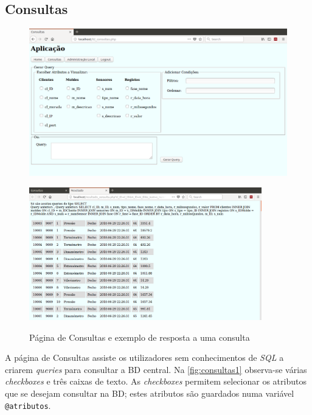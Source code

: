 \documentclass[11pt,twoside,a4paper]{report}
\begin{document}
\subsection{Consultas}
\begin{figure}[H]
	\centering
	\begin{minipage}{1.\textwidth}
		\begin{center}
			\includegraphics[width=.9\textwidth]{consultas01} %
			\label{fig:consultas1}
		\end{center}
	\end{minipage}
	\begin{minipage}{1.\textwidth}
		\begin{center}
			\includegraphics[width=0.9\textwidth]{consultas02} %
			\label{fig:consultas2}
		\end{center}
	\end{minipage}
	\caption{Página de Consultas e exemplo de resposta a uma consulta}
	\label{fig:consultas0}
\end{figure}
A página de Consultas assiste os utilizadores sem conhecimentos de \textit{SQL} a criarem \textit{queries} para consultar a BD central. Na \autoref{fig:consultas1} observa-se várias \textit{checkboxes} e três caixas de texto. As \textit{checkboxes} permitem selecionar os atributos que se desejam consultar na BD; estes atributos são guardados numa variável \texttt{@atributos}.
\end{document}

